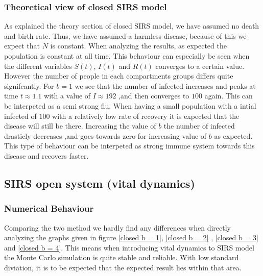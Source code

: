 \documentclass[a4paper, 10pt]{article}
\begin{document}
\subsubsection{Theoretical view of closed SIRS model} As explained the theory section of closed SIRS model, we have assumed
no death and birth rate. Thus, we have assumed a harmless disease, because of this we expect that $N$ is constant. When analyzing the results,
as expected the population is constant at all time. This behaviour can especially
be seen when the different variables $S(t)$, $I(t)$ and $R(t)$ converges to a certain value.
However the number of people in each compartments groups differs quite signifcantly.
For $b = 1$ we see that the number of infected increases and
peaks at time $t \approx 1.1$ with a value of $I \approx 192$ ,and then converges to $100$ again.
This can be interpeted as a semi strong flu. When having a small population with a intial
infected of $100$ with a relatively low rate of recovery it is expected that the disease will still be there.
Increasing the value of $b$ the number of infected drasticly decreases ,and goes towards zero for increasing value of $b$ as expected.
This type of behaviour can be interpeted as strong immune system towards this disease and recovers faster.

\subsection{SIRS open system (vital dynamics)}
\subsubsection{Numerical Behaviour} Comparing the two method we hardly find any differences when directly
analyzing the graphs given in figure \eqref{closed b = 1}, \eqref{closed b = 2} , \eqref{closed b = 3} and \eqref{closed b = 4}.
This means when introducing vital dynamics to SIRS model the Monte Carlo simulation is quite stable and reliable.
With low standard diviation, it is to be expected that the expected result lies within that area.
\end{document}
